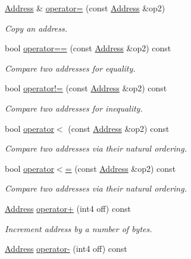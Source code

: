 \begin{DoxyCompactItemize}
\mbox{\hyperlink{class_address}{Address}} \& \mbox{\hyperlink{class_address_a942aba71799e61225a20135d3dc86453}{operator=}} (const \mbox{\hyperlink{class_address}{Address}} \&op2)
\begin{DoxyCompactList}\small\item\em Copy an address. \end{DoxyCompactList}\item 
bool \mbox{\hyperlink{class_address_a6f61edd53efcd9ff5d7f067fb46250dd}{operator==}} (const \mbox{\hyperlink{class_address}{Address}} \&op2) const
\begin{DoxyCompactList}\small\item\em Compare two addresses for equality. \end{DoxyCompactList}\item 
bool \mbox{\hyperlink{class_address_abe25251b102af0a1eed6e5120bb8e8b3}{operator!=}} (const \mbox{\hyperlink{class_address}{Address}} \&op2) const
\begin{DoxyCompactList}\small\item\em Compare two addresses for inequality. \end{DoxyCompactList}\item 
bool \mbox{\hyperlink{class_address_ac2109b6d10183b10d67c7f743bfc21dc}{operator$<$}} (const \mbox{\hyperlink{class_address}{Address}} \&op2) const
\begin{DoxyCompactList}\small\item\em Compare two addresses via their natural ordering. \end{DoxyCompactList}\item 
bool \mbox{\hyperlink{class_address_a8d3c3b93cd942cfeb881ea577dfb869f}{operator$<$=}} (const \mbox{\hyperlink{class_address}{Address}} \&op2) const
\begin{DoxyCompactList}\small\item\em Compare two addresses via their natural ordering. \end{DoxyCompactList}\item 
\mbox{\hyperlink{class_address}{Address}} \mbox{\hyperlink{class_address_a2e0f4cfc80a3284beeb1fa70adcfa9cb}{operator+}} (int4 off) const
\begin{DoxyCompactList}\small\item\em Increment address by a number of bytes. \end{DoxyCompactList}\item 
\mbox{\hyperlink{class_address}{Address}} \mbox{\hyperlink{class_address_adbf6ed048012cc8d1f52e1d4fd63b7aa}{operator-\/}} (int4 off) const

\end{DoxyCompactItemize}
